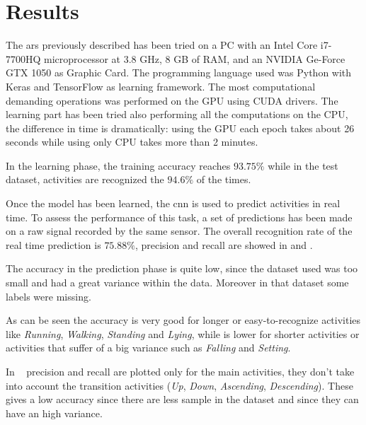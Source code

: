 
\section{Results}
\label{sec:results}

The \gls{ars} previously described has been tried on a PC with an Intel Core i7-7700HQ microprocessor at 3.8 GHz, 8 GB of RAM, and an NVIDIA Ge-Force GTX 1050 as Graphic Card. The programming language used was Python with Keras and TensorFlow as learning framework. The most computational demanding operations was performed on the GPU using CUDA drivers.
The learning part has been tried also performing all the computations on the CPU, the difference in time is dramatically: using the GPU each epoch takes about 26 seconds while using only CPU takes more than 2 minutes.

In the learning phase, the training accuracy reaches $93.75\%$ while in the test dataset, activities are recognized the $94.6\%$ of the times.

Once the model has been learned, the \gls{cnn} is used to predict activities in real time. To assess the performance of this task, a set of predictions has been made on a raw signal recorded by the same sensor. The overall recognition rate of the real time prediction is $75.88\%$, precision and recall are showed in  and .

The accuracy in the prediction phase is quite low, since the dataset used was too small and had a great variance within the data. Moreover in that dataset some labels were missing.

As can be seen the accuracy is very good for longer or easy-to-recognize activities like \textit{Running}, \textit{Walking}, \textit{Standing} and \textit{Lying}, while is lower for shorter activities or activities that suffer of a big variance such as \textit{Falling} and \textit{Setting}.

In ~\cite{Korbinian} precision and recall are plotted only for the main activities, they don't take into account the transition activities (\textit{Up}, \textit{Down}, \textit{Ascending}, \textit{Descending}). These gives a low accuracy since there are less sample in the dataset and since they can have an high variance.

